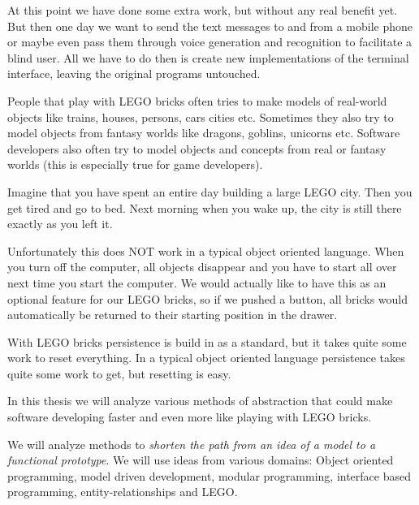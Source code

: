 At this point we have done some extra work, but without any real benefit
yet. But then one day we want to send the text messages to and from
a mobile phone or maybe even pass them through voice generation and
recognition to facilitate a blind user. All we have to do then is
create new implementations of the terminal interface, leaving the
original programs untouched. 

People that play with LEGO bricks often tries to make models of real-world
objects like trains, houses, persons, cars cities etc. Sometimes they
also try to model objects from fantasy worlds like dragons, goblins,
unicorns etc. Software developers also often try to model objects
and concepts from real or fantasy worlds (this is especially true
for game developers).

Imagine that you have spent an entire day building a large LEGO city.
Then you get tired and go to bed. Next morning when you wake up, the
city is still there exactly as you left it.

Unfortunately this does NOT work in a typical object oriented language.
When you turn off the computer, all objects disappear and you have
to start all over next time you start the computer. We would actually
like to have this as an optional feature for our LEGO bricks, so if
we pushed a button, all bricks would automatically be returned to
their starting position in the drawer.

With LEGO bricks persistence is build in as a standard, but it takes
quite some work to reset everything. In a typical object oriented
language persistence takes quite some work to get, but resetting is
easy.

In this thesis we will analyze various methods of abstraction that
could make software developing faster and even more like playing with
LEGO bricks.

We will analyze methods to \emph{shorten the path from an idea of
a model to a functional prototype}. We will use ideas from various
domains: Object oriented programming, model driven development, modular
programming, interface based programming, entity-relationships and
LEGO.
